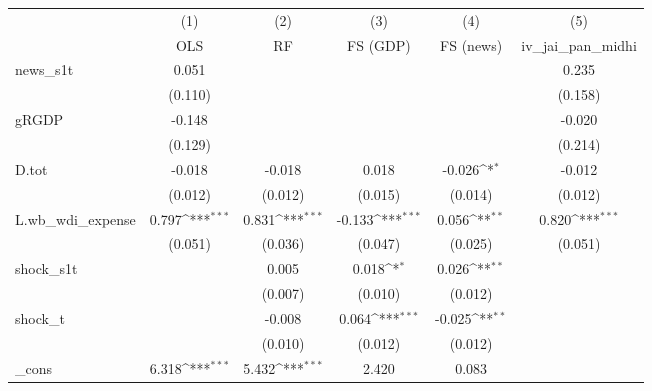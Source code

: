 {
\def\sym#1{\ifmmode^{#1}\else\(^{#1}\)\fi}
\begin{tabular}{l*{5}{c}}
\toprule
            &\multicolumn{1}{c}{(1)}&\multicolumn{1}{c}{(2)}&\multicolumn{1}{c}{(3)}&\multicolumn{1}{c}{(4)}&\multicolumn{1}{c}{(5)}\\
            &\multicolumn{1}{c}{OLS}&\multicolumn{1}{c}{RF}&\multicolumn{1}{c}{FS (GDP)}&\multicolumn{1}{c}{FS (news)}&\multicolumn{1}{c}{iv\_jai\_pan\_midhi}\\
\midrule
news\_s1t    &       0.051         &                     &                     &                     &       0.235         \\
            &     (0.110)         &                     &                     &                     &     (0.158)         \\
\addlinespace
gRGDP       &      -0.148         &                     &                     &                     &      -0.020         \\
            &     (0.129)         &                     &                     &                     &     (0.214)         \\
\addlinespace
D.tot       &      -0.018         &      -0.018         &       0.018         &      -0.026\sym{*}  &      -0.012         \\
            &     (0.012)         &     (0.012)         &     (0.015)         &     (0.014)         &     (0.012)         \\
\addlinespace
L.wb\_wdi\_expense&       0.797\sym{***}&       0.831\sym{***}&      -0.133\sym{***}&       0.056\sym{**} &       0.820\sym{***}\\
            &     (0.051)         &     (0.036)         &     (0.047)         &     (0.025)         &     (0.051)         \\
\addlinespace
shock\_s1t   &                     &       0.005         &       0.018\sym{*}  &       0.026\sym{**} &                     \\
            &                     &     (0.007)         &     (0.010)         &     (0.012)         &                     \\
\addlinespace
shock\_t     &                     &      -0.008         &       0.064\sym{***}&      -0.025\sym{**} &                     \\
            &                     &     (0.010)         &     (0.012)         &     (0.012)         &                     \\
\addlinespace
\_cons      &       6.318\sym{***}&       5.432\sym{***}&       2.420         &       0.083         &                     \\

\end{tabular}}
